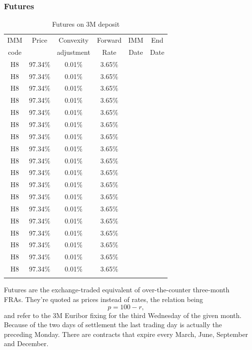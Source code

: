 \documentclass[11pt,reqno]{amsart}
\begin{document}
\subsubsection{\label{SecFutures}Futures}
\begin{table}[tbp]
\label{tab:Futures}
\begin{tabular}{cccccc}
IMM  & Price & Convexity  & Forward & IMM  & End  \\
code &       & adjustment & Rate    & Date & Date \\
H8 & 97.34\% & 0.01\% & 3.65\% &  &  \\
H8 & 97.34\% & 0.01\% & 3.65\% &  &  \\
H8 & 97.34\% & 0.01\% & 3.65\% &  &  \\
H8 & 97.34\% & 0.01\% & 3.65\% &  &  \\
H8 & 97.34\% & 0.01\% & 3.65\% &  &  \\
H8 & 97.34\% & 0.01\% & 3.65\% &  &  \\
H8 & 97.34\% & 0.01\% & 3.65\% &  &  \\
H8 & 97.34\% & 0.01\% & 3.65\% &  &  \\
H8 & 97.34\% & 0.01\% & 3.65\% &  &  \\
H8 & 97.34\% & 0.01\% & 3.65\% &  &  \\
H8 & 97.34\% & 0.01\% & 3.65\% &  &  \\
H8 & 97.34\% & 0.01\% & 3.65\% &  &  \\
H8 & 97.34\% & 0.01\% & 3.65\% &  &  \\
H8 & 97.34\% & 0.01\% & 3.65\% &  &  \\
H8 & 97.34\% & 0.01\% & 3.65\% &  &  \\
H8 & 97.34\% & 0.01\% & 3.65\% &  &  \\
H8 & 97.34\% & 0.01\% & 3.65\% &  &  \\
H8 & 97.34\% & 0.01\% & 3.65\% &  &  \\
&  &  &  &  &
\end{tabular}%
\caption{Futures on 3M deposit}
\end{table}

Futures are the exchange-traded equivalent of over-the-counter three-month FRAs.  They're quoted as prices instead of rates, the relation being
\begin{equation}
p = 100 - r,
\label{eqn:futurepricerate}
\end{equation}
and refer to the 3M Euribor fixing for the third Wednesday of the given month. Because of the two days of settlement the last trading day is actually the preceding Monday. There are contracts that expire every March, June, September and December.
\end{document}
